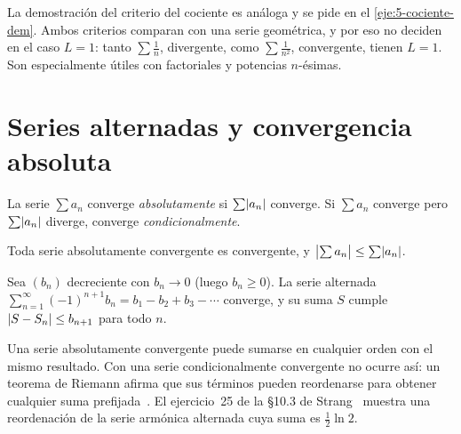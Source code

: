La demostración del criterio del cociente es análoga y se pide en el \cref{eje:5-cociente-dem}. Ambos criterios comparan con una serie geométrica, y por eso no deciden en el caso $L=1$: tanto $\sum\frac1n$, divergente, como $\sum\frac{1}{n^{2}}$, convergente, tienen $L=1$. Son especialmente útiles con factoriales y potencias $n$-ésimas.

\addtocounter{definicion}{1}%

\section{Series alternadas y convergencia absoluta}

\begin{definicion}\label{def:absoluta}
La serie $\sum a_n$ converge \emph{absolutamente} si $\sum\lvert a_n\rvert$ converge. Si $\sum a_n$ converge pero $\sum\lvert a_n\rvert$ diverge, converge \emph{condicionalmente}.
\end{definicion}

\begin{teorema}\label{teo:absoluta-series}
Toda serie absolutamente convergente es convergente, y $\bigl|\sum a_n\bigr|\le\sum\lvert a_n\rvert$.
\end{teorema}

\begin{teorema}\label{teo:leibniz}
Sea $(b_n)$ decreciente con $b_n\to0$ (luego $b_n\ge0$). La serie alternada $\sum_{n=1}^{\infty}(-1)^{n+1}b_n=b_1-b_2+b_3-\cdots$ converge, y su suma $S$ cumple $\lvert S-S_n\rvert\le b_{n+1}$ para todo $n$.
\end{teorema}

\addtocounter{definicion}{1}%

\begin{observacion}[Reordenaciones]
Una serie absolutamente convergente puede sumarse en cualquier orden con el mismo resultado. Con una serie condicionalmente convergente no ocurre así: un teorema de Riemann afirma que sus términos pueden reordenarse para obtener cualquier suma prefijada~\cite[cap.~23]{spivak}. El ejercicio~25 de la §10.3 de Strang~\cite{strang} muestra una reordenación de la serie armónica alternada cuya suma es $\frac12\ln2$.
\end{observacion}

\addtocounter{definicion}{1}%

\addtocounter{definicion}{1}%

